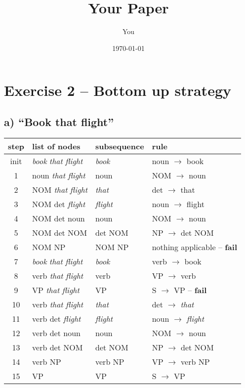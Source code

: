 \documentclass[a4paper]{article}
\title{Your Paper}
\author{You}
\date{\today}
\newcommand{\ra}{$\rightarrow$ }
\newcommand{\f}{-- \textbf{fail}}
\begin{document}
\section*{Exercise 2 -- Bottom up strategy}
\subsection*{a) ``Book that flight''}

\vspace{3mm}
\begin{tabular}{| c | l | l | l |}
\hline 
\textbf{step} & \textbf{list of nodes} & \textbf{subsequence} & \textbf{rule}  \\ \hline
init & \textit{book} \textit{that} \textit{flight} & \textit{book} & noun \ra book  \\
1 & noun \textit{that} \textit{flight} & noun & NOM \ra noun  \\
2 & NOM \textit{that} \textit{flight} & \textit{that} & det \ra that  \\
3 & NOM det \textit{flight} & \textit{flight} & noun \ra flight \\
4 & NOM det noun & noun & NOM \ra noun \\
5 & NOM det NOM & det NOM & NP \ra det NOM \\
6 & NOM NP & NOM NP & nothing applicable \f \\
7 & \textit{book} \textit{that} \textit{flight} & \textit{book} & verb \ra book \\
8 & verb \textit{that} \textit{flight} & verb & VP \ra verb \\
9 & VP \textit{that} \textit{flight} & VP & S \ra VP  \f \\
10 & verb \textit{that} \textit{flight} & \textit{that} & det \ra \textit{that} \\
11 & verb det \textit{flight} & \textit{flight} & noun \ra \textit{flight} \\
12 & verb det noun & noun & NOM \ra noun \\
13 & verb det NOM & det NOM & NP \ra det NOM \\
14 & verb NP & verb NP & VP \ra verb NP \\
15 & VP & VP & S \ra VP \\
\hline
\end{tabular}
\end{document}
